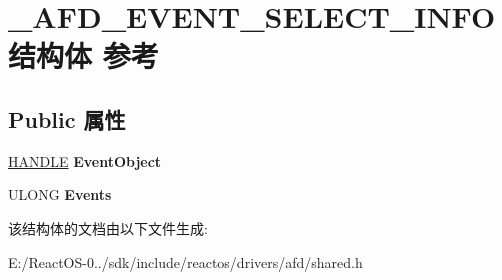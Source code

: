 \hypertarget{struct___a_f_d___e_v_e_n_t___s_e_l_e_c_t___i_n_f_o}{}\section{\+\_\+\+A\+F\+D\+\_\+\+E\+V\+E\+N\+T\+\_\+\+S\+E\+L\+E\+C\+T\+\_\+\+I\+N\+F\+O结构体 参考}
\label{struct___a_f_d___e_v_e_n_t___s_e_l_e_c_t___i_n_f_o}
\subsection*{Public 属性}
\begin{DoxyCompactItemize}
\item 
\mbox{\label{struct___a_f_d___e_v_e_n_t___s_e_l_e_c_t___i_n_f_o_a59ca7d48c7d44b82e55b9c1d95fd9578}} 
\hyperlink{interfacevoid}{H\+A\+N\+D\+LE} {\bfseries Event\+Object}
\item 
\mbox{\label{struct___a_f_d___e_v_e_n_t___s_e_l_e_c_t___i_n_f_o_a763013c3d4e524938ebf3eef00f7ae08}} 
U\+L\+O\+NG {\bfseries Events}
\end{DoxyCompactItemize}


该结构体的文档由以下文件生成\+:\begin{DoxyCompactItemize}
\item 
E\+:/\+React\+O\+S-\/0../sdk/include/reactos/drivers/afd/shared.\+h\end{DoxyCompactItemize}
